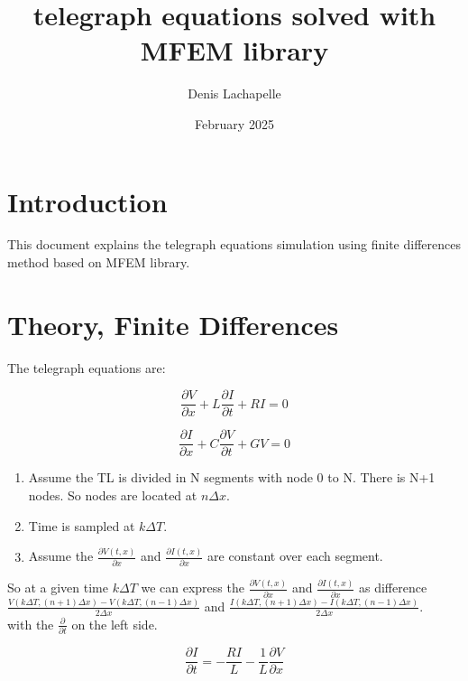 \documentclass[12pt, letterpaper]{article}
\title{telegraph equations solved with MFEM library}
\author{Denis Lachapelle}
\date{February 2025}
\begin{document}
\maketitle

\section{Introduction}
This document explains the telegraph equations simulation using finite differences method based on MFEM library.


\section{Theory, Finite Differences}

The telegraph equations are:

\begin{equation}\frac{\partial{V}}{\partial{x}} + L \frac{\partial{I}}{\partial{t}} + R I = 0\end{equation}


\begin{equation}\frac{\partial{I}}{\partial{x}} + C \frac{\partial{V}}{\partial{t}} + G V = 0\end{equation}


\begin{enumerate}
\item Assume the TL is divided in N segments with node 0 to N. There is N+1 nodes. So nodes are located at $n \Delta x$.
\item Time is sampled at $k \Delta T$.
\item Assume the $\frac{\partial V(t, x)}{\partial x}$ and $\frac{\partial I(t, x)}{\partial x}$ are constant over each segment.
\end{enumerate}

So at a given time $k \Delta T$ we can express the $\frac{\partial V(t, x)}{\partial x}$ and $\frac{\partial I(t, x)}{\partial x}$ as difference  $\frac{V(k \Delta T, (n+1) \Delta x) - V(k \Delta T, (n-1) \Delta x)}{2 \Delta x}$ and  $\frac{I(k \Delta T, (n+1) \Delta x) - I(k \Delta T, (n-1) \Delta x)}{2 \Delta x}$.\\

with the $\frac{\partial}{\partial t}$ on the left side.

\begin{equation} \frac{\partial{I}}{\partial{t}} = - \frac{R I}{L} - \frac{1}{L} \frac{\partial{V}}{\partial{x}} \end{equation}
\end{document}

